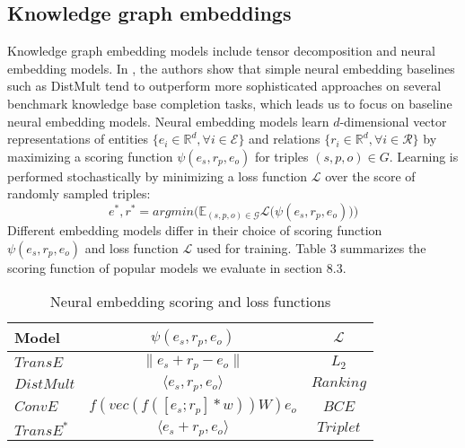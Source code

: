 \subsection{Knowledge graph embeddings}
Knowledge graph embedding models include tensor decomposition and neural embedding models. In \cite{kadlec2017knowledge}, the authors show that simple neural embedding baselines such as DistMult \cite{yang2015embedding} tend to outperform more sophisticated approaches on several benchmark knowledge base completion tasks, which leads us to focus on baseline neural embedding models. Neural embedding models learn $d$-dimensional vector representations of entities $\{e_i \in \mathbb{R}^d, \forall i \in \mathcal{E}\}$ and relations $\{r_i \in \mathbb{R}^d, \forall i \in \mathcal{R}\}$ by maximizing a scoring function $\psi(e_s,r_p,e_o)$ for triples $(s,p,o) \in G$. Learning is performed stochastically by minimizing a loss function $\mathcal{L}$ over the score of randomly sampled triples: 
\begin{equation} 
e^{*}, r^{*} = argmin\Big(\mathbb{E}_{(s,p,o) \in \mathcal{G}}\mathcal{L}\big(\psi(e_s,r_p,e_o)\big)\Big)
\end{equation} 
Different embedding models differ in their choice of scoring function $\psi(e_s,r_p,e_o)$ and loss function $\mathcal{L}$ used for training. Table 3 summarizes the scoring function of popular models we evaluate in section 8.3.
\begin{table}[t]
  \centering
\caption{Neural embedding scoring and loss functions}
\begin{tabular}{ l c  c}
\hline			
Model & $\psi(e_s,r_p,e_o)$ & $\mathcal{L}$\\
\hline			
$TransE$ \cite{bordes2013translating} & $ \|e_s + r_p - e_o \|$  & $L_2$\\
$DistMult$ \cite{yang2015embedding} & $\langle e_s, r_p, e_o \rangle$ & $Ranking$\\
$ConvE$ \cite{dettmers2017convolutional}  & $ f(vec(f([e_s;r_p] * w))W)e_o $ & $BCE$\\
$TransE^*$ & $\langle e_s + r_p, e_o \rangle$ & $Triplet$ \\
\hline		
\end{tabular}
\end{table}
